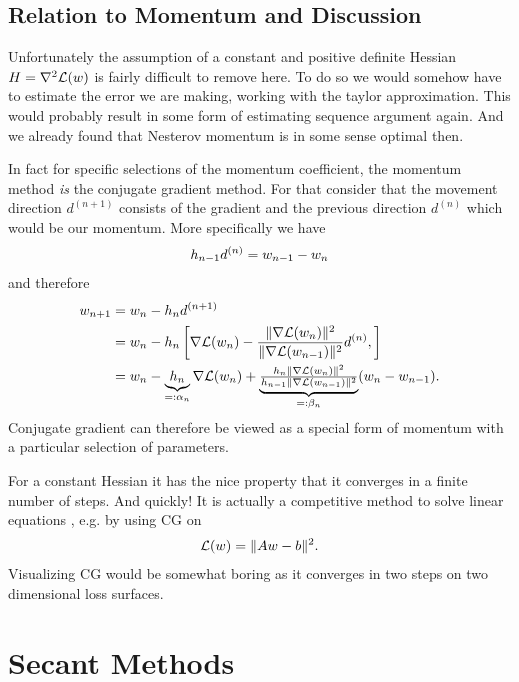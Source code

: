 \subsection{Relation to Momentum and Discussion}

Unfortunately the assumption of a constant and positive definite Hessian
\(H=\nabla^2\mathcal{L}(w)\) is fairly difficult to remove here. To do so
we would somehow have to estimate the error we are making, working with the taylor
approximation. This would probably result in some form of estimating sequence
argument again. And we already found that Nesterov momentum is in some sense
optimal then.

In fact for specific selections of the momentum coefficient, the momentum method
\emph{is} the conjugate gradient method. For that consider that the movement
direction \(d^{(n+1)}\) consists of the gradient and the previous direction
\(d^{(n)}\) which would be our momentum. More specifically we have
\begin{align*}
	h_{n-1}d^{(n)} = w_{n-1} - w_n
\end{align*}
and therefore
\begin{align*}
	w_{n+1}
	&= w_n - h_n d^{(n+1)}\\
	&= w_n - h_n \left[
		\nabla\mathcal{L}(w_n)
		- \frac{\|\nabla\mathcal{L}(w_n)\|^2}{\|\nabla\mathcal{L}(w_{n-1})\|^2}
		d^{(n)},
	\right]\\
	&= w_n - \underbrace{h_n}_{=:\alpha_n} \nabla\mathcal{L}(w_n)
		+ \underbrace{\tfrac{h_n\|\nabla\mathcal{L}(w_n)\|^2}{h_{n-1}\|\nabla\mathcal{L}(w_{n-1})\|^2}}_{=:\beta_n}
		(w_n-w_{n-1}).
\end{align*}
Conjugate gradient can therefore be viewed as a special form of momentum with
a particular selection of parameters.

For a constant Hessian it has the nice property that it converges in
a finite number of steps. And quickly! It is actually a competitive method to
solve linear equations \parencite[Section 10]{shewchukIntroductionConjugateGradient1994},
e.g. by using CG on
\begin{align*}
	\mathcal{L}(w) = \|Aw - b\|^2.
\end{align*}
Visualizing CG would be somewhat boring as it converges in two steps on two
dimensional loss surfaces.

\section{Secant Methods}


